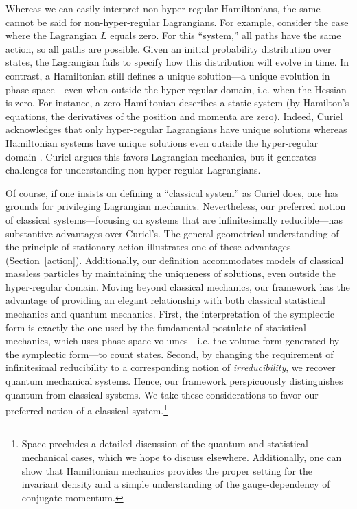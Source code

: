 \documentclass[12pt, twoside]{article}
\begin{document}
Whereas we can easily interpret non-hyper-regular Hamiltonians, the same cannot be said for non-hyper-regular Lagrangians. For example, consider the case where the Lagrangian $L$ equals zero. For this ``system,'' all paths have the same action, so all paths are possible. Given an initial probability distribution over states, the Lagrangian fails to specify how this distribution will evolve in time. In contrast, a Hamiltonian still defines a unique solution---a unique evolution in phase space---even when outside the hyper-regular domain, i.e. when the Hessian is zero. For instance, a zero Hamiltonian describes a static system (by Hamilton's equations, the derivatives of the position and momenta are zero). Indeed, Curiel acknowledges that only hyper-regular Lagrangians have unique solutions whereas Hamiltonian systems have unique solutions even outside the hyper-regular domain \parencites*[291, 308]{Curiel}. Curiel argues this favors Lagrangian mechanics, but it generates challenges for understanding non-hyper-regular Lagrangians.

Of course, if one insists on defining a ``classical system'' as Curiel does, one has grounds for privileging Lagrangian mechanics. Nevertheless, our preferred notion of classical systems---focusing on systems that are infinitesimally reducible---has substantive advantages over Curiel's. The general geometrical understanding of the principle of stationary action illustrates one of these advantages (Section~\ref{action}). Additionally, our definition accommodates models of classical massless particles by maintaining the uniqueness of solutions, even outside the hyper-regular domain. Moving beyond classical mechanics, our framework has the advantage of providing an elegant relationship with both classical statistical mechanics and quantum mechanics. First, the interpretation of the symplectic form is exactly the one used by the fundamental postulate of statistical mechanics, which uses phase space volumes---i.e. the volume form generated by the symplectic form---to count states. Second, by changing the requirement of infinitesimal reducibility to a corresponding notion of \textit{irreducibility}, we recover quantum mechanical systems. Hence, our framework perspicuously distinguishes quantum from classical systems. We take these considerations to favor our preferred notion of a classical system.\footnote{Space precludes a detailed discussion of the quantum and statistical mechanical cases, which we hope to discuss elsewhere. Additionally, one can show that Hamiltonian mechanics provides the proper setting for the invariant density and a simple understanding of the gauge-dependency of conjugate momentum.}  
\end{document}
